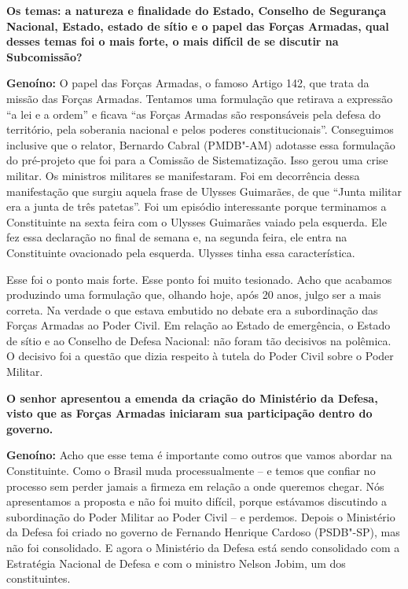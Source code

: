 \textbf{Os temas: a natureza e finalidade do Estado, Conselho de
Segurança Nacional, Estado, estado de sítio e o papel das Forças
Armadas, qual desses temas foi o mais forte, o mais difícil de se
discutir na Subcomissão?}

\textbf{Genoíno:} O papel das Forças Armadas, o famoso Artigo 142, que
trata da missão das Forças Armadas. Tentamos uma formulação que retirava
a expressão ``a lei e a ordem'' e ficava ``as Forças Armadas são
responsáveis pela defesa do território, pela soberania nacional e pelos
poderes constitucionais''. Conseguimos inclusive que o relator, Bernardo
Cabral (PMDB"-AM) adotasse essa formulação do pré-projeto que foi para a
Comissão de Sistematização. Isso gerou uma crise militar. Os ministros
militares se manifestaram. Foi em decorrência dessa manifestação que
surgiu aquela frase de Ulysses Guimarães, de que ``Junta militar era a
junta de três patetas''. Foi um episódio interessante porque terminamos
a Constituinte na sexta feira com o Ulysses Guimarães vaiado pela
esquerda. Ele fez essa declaração no final de semana e, na segunda
feira, ele entra na Constituinte ovacionado pela esquerda. Ulysses tinha
essa característica.

Esse foi o ponto mais forte. Esse ponto foi muito tesionado. Acho que
acabamos produzindo uma formulação que, olhando hoje, após 20 anos,
julgo ser a mais correta. Na verdade o que estava embutido no debate era
a subordinação das Forças Armadas ao Poder Civil. Em relação ao Estado
de emergência, o Estado de sítio e ao Conselho de Defesa Nacional: não
foram tão decisivos na polêmica. O decisivo foi a questão que dizia
respeito à tutela do Poder Civil sobre o Poder Militar.

\textbf{O senhor apresentou a emenda da criação do Ministério da Defesa,
visto que as Forças Armadas iniciaram sua participação dentro do
governo.}

\textbf{Genoíno:} Acho que esse tema é importante como outros que vamos
abordar na Constituinte. Como o Brasil muda processualmente -- e temos
que confiar no processo sem perder jamais a firmeza em relação a onde
queremos chegar. Nós apresentamos a proposta e não foi muito difícil,
porque estávamos discutindo a subordinação do Poder Militar ao Poder
Civil -- e perdemos. Depois o Ministério da Defesa foi criado no governo
de Fernando Henrique Cardoso (PSDB"-SP), mas não foi consolidado. E agora
o Ministério da Defesa está sendo consolidado com a Estratégia Nacional
de Defesa e com o ministro Nelson Jobim, um dos constituintes.

